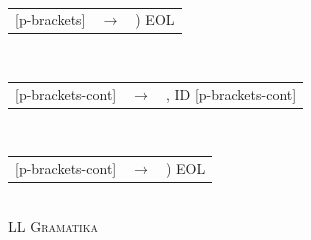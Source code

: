 \documentclass[11pt, a4paper]{article}
\begin{document}
\begin{algorithm}[H]
\begin{tabularx}{\textwidth}{l>{$}c<{$}X}
\end{tabularx}\\ 
  \begin{tabularx}{\textwidth}{l>{$}c<{$}X}
  {[p-brackets]}   &\rightarrow& ) EOL
\end{tabularx}\\ 
  \begin{tabularx}{\textwidth}{l>{$}c<{$}X}
  {[p-brackets-cont]}&\rightarrow& , ID [p-brackets-cont]
\end{tabularx}\\ 
  \begin{tabularx}{\textwidth}{l>{$}c<{$}X}
  {[p-brackets-cont]} &\rightarrow& ) EOL
\end{tabularx}\\ 

  \caption{\textsc{LL Gramatika}}
\end{algorithm}
\end{document}
